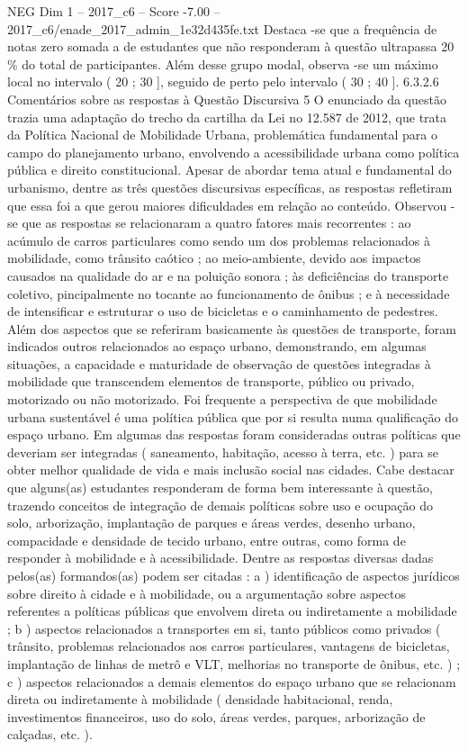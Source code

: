 \begin{textsample}{NEG Dim 1 – 2017\_c6 – Score -7.00 – 2017\_c6/enade\_2017\_admin\_1e32d435fe.txt}
Destaca -se que a frequência de notas zero somada a de estudantes que não responderam à questão ultrapassa 20 \% do total de participantes.
Além desse grupo modal, observa -se um máximo local no intervalo ( 20 ; 30 ], seguido de perto pelo intervalo ( 30 ; 40 ]. 6.3.2.6 Comentários sobre as respostas à Questão Discursiva 5 O enunciado da questão trazia uma adaptação do trecho da cartilha da Lei no 12.587 de 2012, que trata da Política Nacional de Mobilidade Urbana, problemática fundamental para o campo do planejamento urbano, envolvendo a acessibilidade urbana como política pública e direito constitucional.
Apesar de abordar tema atual e fundamental do urbanismo, dentre as três questões discursivas específicas, as respostas refletiram que essa foi a que gerou maiores dificuldades em relação ao conteúdo.
Observou -se que as respostas se relacionaram a quatro fatores mais recorrentes : ao acúmulo de carros particulares como sendo um dos problemas relacionados à mobilidade, como trânsito caótico ; ao meio-ambiente, devido aos impactos causados na qualidade do ar e na poluição sonora ; às deficiências do transporte coletivo, pincipalmente no tocante ao funcionamento de ônibus ; e à necessidade de intensificar e estruturar o uso de bicicletas e o caminhamento de pedestres.
Além dos aspectos que se referiram basicamente às questões de transporte, foram indicados outros relacionados ao espaço urbano, demonstrando, em algumas situações, a capacidade e maturidade de observação de questões integradas à mobilidade que transcendem elementos de transporte, público ou privado, motorizado ou não motorizado.
Foi frequente a perspectiva de que mobilidade urbana sustentável é uma política pública que por si resulta numa qualificação do espaço urbano.
Em algumas das respostas foram consideradas outras políticas que deveriam ser integradas ( saneamento, habitação, acesso à terra, etc. ) para se obter melhor qualidade de vida e mais inclusão social nas cidades.
Cabe destacar que alguns(as) estudantes responderam de forma bem interessante à questão, trazendo conceitos de integração de demais políticas sobre uso e ocupação do solo, arborização, implantação de parques e áreas verdes, desenho urbano, compacidade e densidade de tecido urbano, entre outras, como forma de responder à mobilidade e à acessibilidade.
Dentre as respostas diversas dadas pelos(as) formandos(as) podem ser citadas : a ) identificação de aspectos jurídicos sobre direito à cidade e à mobilidade, ou a argumentação sobre aspectos referentes a políticas públicas que envolvem direta ou indiretamente a mobilidade ; b ) aspectos relacionados a transportes em si, tanto públicos como privados ( trânsito, problemas relacionados aos carros particulares, vantagens de bicicletas, implantação de linhas de metrô e VLT, melhorias no transporte de ônibus, etc. ) ; c ) aspectos relacionados a demais elementos do espaço urbano que se relacionam direta ou indiretamente à mobilidade ( densidade habitacional, renda, investimentos financeiros, uso do solo, áreas verdes, parques, arborização de calçadas, etc. ).

\end{textsample}
